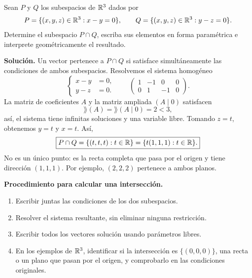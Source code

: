 \documentclass[compacto,10pt]{pubciencias-notas}
\begin{document}
\begin{ejem}
    Sean $P$ y $Q$ los subespacios de $\mathbb{R}^3$ dados por
    \[
        P=\{(x,y,z)\in\mathbb{R}^3:x-y=0\},\qquad
        Q=\{(x,y,z)\in\mathbb{R}^3:y-z=0\}.
    \]
    Determine el subespacio $P\cap Q$, escriba sus elementos en forma
    paramétrica e interprete geométricamente el resultado.

    \textbf{Solución.} Un vector pertenece a $P\cap Q$ si satisface
    simultáneamente las condiciones de ambos subespacios. Resolvemos el
    sistema homogéneo
    \[
        \left\{\begin{aligned}x-y&=0,\\y-z&=0.\end{aligned}\right.
        \qquad
        \left(\begin{array}{ccc|c}1&-1&0&0\\0&1&-1&0\end{array}\right).
    \]
    La matriz de coeficientes $A$ y la matriz ampliada $(A\mid0)$ satisfacen
    \[
        \rang(A)=\rang(A\mid0)=2<3,
    \]
    así, el sistema tiene infinitas soluciones
    y una variable libre. Tomando $z=t$, obtenemos $y=t$ y $x=t$. Así,
    \[
        \boxed{P\cap Q=\{(t,t,t):t\in\mathbb{R}\}=\{t(1,1,1):t\in\mathbb{R}\}.}
    \]
    No es un único punto: es la recta completa que pasa por el origen y tiene dirección
    $(1,1,1)$. Por ejemplo, $(2,2,2)$ pertenece a ambos planos.
\end{ejem}

\begin{center}
\end{center}

\noindent\textbf{Procedimiento para calcular una intersección.}
\begin{enumerate}
    \item Escribir juntas las condiciones de los dos subespacios.
    \item Resolver el sistema resultante, sin eliminar ninguna restricción.
    \item Escribir todos los vectores solución usando parámetros libres.
    \item En los ejemplos de $\mathbb{R}^3$, identificar si la intersección es $\{(0,0,0)\}$, una recta
          o un plano que pasan por el origen,
          y comprobarlo en las condiciones originales.
\end{enumerate}
\end{document}
